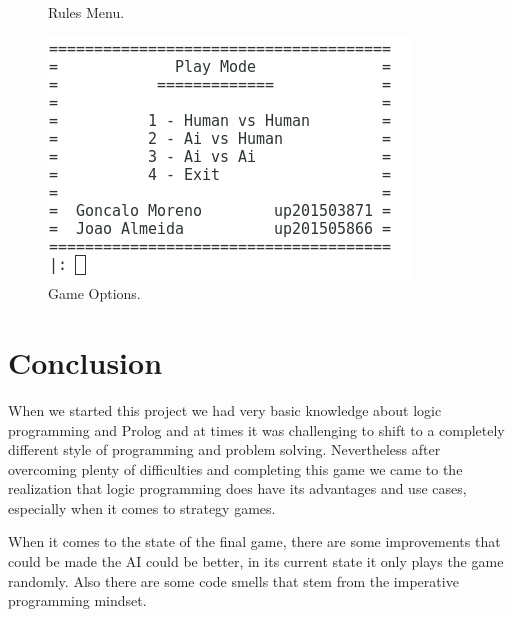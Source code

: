 \documentclass[a4paper]{article}
\begin{document}
\begin{figure}[H]
  \caption{Rules Menu.}\label{fig:menu_info}
\endminipage \hspace{2mm}
%
  \includegraphics[width=\linewidth]{menu_play.png}\hspace{0.5cm}
  \caption{Game Options.}\label{fig:menu_play}
\endminipage\hfill


\end{figure}

%

\newpage

\section{Conclusion}
When we started this project we had very basic knowledge about logic programming and Prolog and at times
it was challenging to shift to a completely different style of programming and problem solving.
Nevertheless after overcoming plenty of difficulties and completing this game we came to the realization
that logic programming does have its advantages and use cases, especially when it comes to strategy games.
\par
When it comes to the state of the final game, there are some improvements that could be made the AI could be better,
in its current state it only plays the game randomly. Also there are some code smells that stem from the imperative programming
mindset.


\clearpage




%
\end{document}
